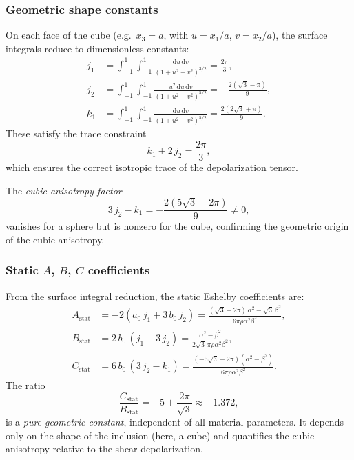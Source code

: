 \documentclass[11pt,a4paper]{article}
\newcommand{\dd}{\mathrm{d}}
\begin{document}
\subsubsection{Geometric shape constants}

On each face of the cube (e.g.\ $x_3 = a$, with $u = x_1/a$,
$v = x_2/a$), the surface integrals reduce to dimensionless
constants:
\begin{align}
  j_1 &= \int_{-1}^{1}\!\!\int_{-1}^{1}
    \frac{\dd u\,\dd v}{(1 + u^2 + v^2)^{3/2}}
  = \frac{2\pi}{3}, \label{eq:j1} \\[6pt]
  j_2 &= \int_{-1}^{1}\!\!\int_{-1}^{1}
    \frac{u^2\,\dd u\,\dd v}{(1 + u^2 + v^2)^{5/2}}
  = -\frac{2(\sqrt{3} - \pi)}{9}, \label{eq:j2} \\[6pt]
  k_1 &= \int_{-1}^{1}\!\!\int_{-1}^{1}
    \frac{\dd u\,\dd v}{(1 + u^2 + v^2)^{5/2}}
  = \frac{2(2\sqrt{3} + \pi)}{9}. \label{eq:k1}
\end{align}
These satisfy the trace constraint
\begin{equation}
  \boxed{k_1 + 2\,j_2 = \frac{2\pi}{3},}
  \label{eq:trace}
\end{equation}
which ensures the correct isotropic trace of the depolarization
tensor.

The \emph{cubic anisotropy factor}
\begin{equation}
  3\,j_2 - k_1 = -\frac{2(5\sqrt{3} - 2\pi)}{9}
  \neq 0,
  \label{eq:aniso_factor}
\end{equation}
vanishes for a sphere but is nonzero for the cube, confirming the
geometric origin of the cubic anisotropy.

\subsubsection{Static \texorpdfstring{$A$, $B$, $C$}{A, B, C}
  coefficients}

From the surface integral reduction, the static Eshelby
coefficients are:
\begin{align}
  A_\text{stat} &= -2(a_0\,j_1 + 3\,b_0\,j_2)
  = \frac{(\sqrt{3} - 2\pi)\,\alpha^2 - \sqrt{3}\,\beta^2}
         {6\pi\rho\alpha^2\beta^2},
  \label{eq:Astat} \\[6pt]
  B_\text{stat} &= 2\,b_0\,(j_1 - 3\,j_2)
  = \frac{\alpha^2 - \beta^2}
         {2\sqrt{3}\,\pi\rho\alpha^2\beta^2},
  \label{eq:Bstat} \\[6pt]
  C_\text{stat} &= 6\,b_0\,(3\,j_2 - k_1)
  = \frac{(-5\sqrt{3} + 2\pi)(\alpha^2 - \beta^2)}
         {6\pi\rho\alpha^2\beta^2}.
  \label{eq:Cstat}
\end{align}
The ratio
\begin{equation}
  \boxed{
  \frac{C_\text{stat}}{B_\text{stat}}
  = -5 + \frac{2\pi}{\sqrt{3}}
  \approx -1.372,
  }
  \label{eq:CoverB}
\end{equation}
is a \emph{pure geometric constant}, independent of all material
parameters. It depends only on the shape of the inclusion
(here, a cube) and quantifies the cubic anisotropy relative to the
shear depolarization.
\end{document}
